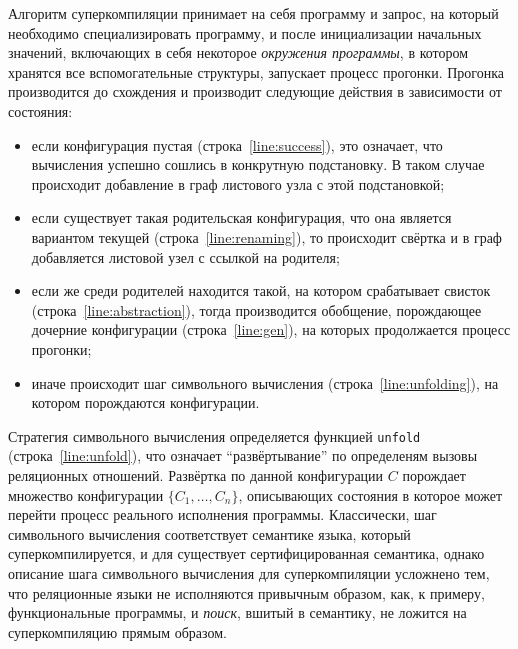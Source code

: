 Алгоритм суперкомпиляции принимает на себя программу и запрос,
на который необходимо специализировать программу, и после
инициализации начальных значений, включающих в себя некоторое \emph{окружения программы},
в котором хранятся все вспомогательные структуры, запускает процесс прогонки.
Прогонка производится до схождения и производит следующие действия в
зависимости от состояния:
\begin{itemize}
\item если конфигурация пустая (строка~\ref{line:success}), это означает, что вычисления
      успешно сошлись в конкрутную подстановку. В таком случае происходит добавление
      в граф листового узла с этой подстановкой;
\item если существует такая родительская конфигурация, что она является вариантом текущей (строка~\ref{line:renaming}),
      то происходит свёртка и в граф добавляется листовой узел с ссылкой на родителя;
\item если же среди родителей находится такой, на котором срабатывает свисток (строка~\ref{line:abstraction}),
      тогда производится обобщение, порождающее дочерние конфигурации (строка~\ref{line:gen}),
      на которых продолжается процесс прогонки;
\item иначе происходит шаг символьного вычисления (строка~\ref{line:unfolding}), на котором
      порождаются конфигурации.

\end{itemize}

Стратегия символьного вычисления определяется функцией \lstinline{unfold}
(строка~\ref{line:unfold}), что означает ``развёртывание'' по определеням вызовы реляционных отношений.
Развёртка по данной конфигурации $C$ порождает
множество конфигурации $\{ C_1, \dots, C_n \}$, описывающих состояния в которое может перейти
процесс реального исполнения программы. Классически, шаг символьного
вычисления соответствует семантике языка, который суперкомпилируется,
и для \ukanren существует сертифицированная семантика\cite{semanticMK},
однако описание шага символьного вычисления \ukanren для суперкомпиляции 
усложнено тем, что реляционные языки не исполняются привычным образом,
как, к примеру, функциональные программы, и \emph{поиск}, вшитый в семантику,
не ложится на суперкомпиляцию прямым образом.

